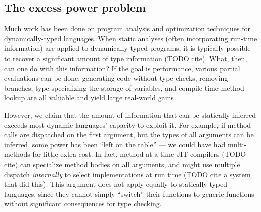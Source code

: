 


\subsection{The excess power problem}

Much work has been done on program analysis and optimization techniques
for dynamically-typed languages.
When static analyses (often incorporating run-time information) are applied
to dynamically-typed programs, it is typically possible to recover a
significant amount of type information (TODO cite). What, then, can one
do with this information? If the goal is performance, various partial
evaluations can be done: generating code without type checks, removing
branches, type-specializing the storage of variables, and compile-time
method lookup are all valuable and yield large real-world gains.

However, we claim that the amount of information that can be statically inferred
exceeds most dynamic languages' capacity to exploit it. For example,
if method calls are dispatched on the first argument, but the types of all
arguments can be inferred, some power has been ``left on the table'' ---
we could have had multi-methods for little extra cost. In fact, method-at-a-time
JIT compilers (TODO cite) can specialize method bodies on all arguments,
and might use multiple dispatch \emph{internally} to select implementations
at run time (TODO cite a system that did this). This argument does not
apply equally to statically-typed languages, since they cannot simply
``switch'' their functions to generic functions without significant
consequences for type checking.

